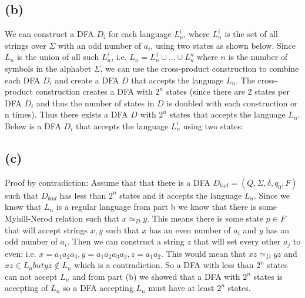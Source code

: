 \documentclass[12pt]{article}
\begin{document}
\subsection*{(b)}
  We can construct a DFA $D_i$ for each language $L^i_n$, where $L^i_n$ is the
  set of all strings over $\Sigma$ with an odd number of $a_i$, using two states
  as shown below. Since $L_n$ is the union of all such $L^i_n$, i.e.
  $L_n = L^1_n \cup \dots \cup L^n_n$ where $n$ is the number of symbols in the
  alphabet $\Sigma$, we can use the cross-product construction to combine each
  DFA $D_i$ and create a DFA $D$ that accepts the language $L_n$.
  The cross-product construction creates a DFA with $2^n$ states (since there
  are 2 states per DFA $D_i$ and thus the number of states in $D$ is doubled
  with each construction or n times). Thus there exists a DFA $D$ with $2^n$
  states that accepts the language $L_n$.
  \vspace{0.5cm}
  Below is a DFA $D_i$ that accepts the language $L^i_n$ using two states:
  \newline
  \begin{center}
  \end{center}

\subsection*{(c)}
Proof by contradiction:\newline
\indent Assume that that there is a DFA $D_{bad} = (Q, \Sigma, \delta, q_0, F)$
such that $D_{bad}$ has less than $2^n$ states and it accepts the language
$L_n$. Since we know that $L_n$ is a regular language from part b we know that
there is some Myhill-Nerod relation such that $x \simeq_D y$. This means there
is some state $p \in F$ that will accept strings $x, y$ such that $x$ has an
even number of $a_i$ and $y$ has an odd number of $a_i$. Then we can construct
a string $z$ that will set every other $a_j$ to even:
i.e. $x = a_1a_2a_3 , y=a_1a_2a_3a_3 , z=a_1a_2$.  This would mean that
$xz \simeq_D yz$ and $xz \in L_n but yz \notin L_n$ which is a contradiction.
So a DFA with less than $2^n$ states can not accept $L_n$ and from part (b) we
showed that a DFA with $2^n$ states is accepting of $L_n$ so a DFA accepting
$L_n$ must have at least $2^n$ states.
\end{document}
